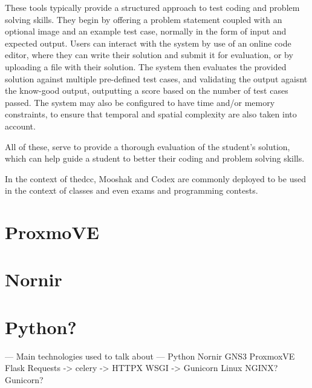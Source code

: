 These tools typically provide a structured approach to test coding and problem solving skills. They begin by offering a
problem statement coupled with an optional image and an example test case, normally in the form of input and expected output.
Users can interact with the system by use of an online code editor, where they can write their solution and submit it for
evaluation, or by uploading a file with their solution. The system then evaluates the provided solution against multiple
pre-defined test cases, and validating the output agaisnt the know-good output, outputting a score based on the number of 
test cases passed. The system may also be configured to have time and/or memory constraints, to ensure that temporal and
spatial complexity are also taken into account.

All of these, serve to provide a thorough evaluation of the student's solution, which can help guide a student to better
their coding and problem solving skills.

In the context of the\ac{dcc}, Mooshak and Codex are commonly deployed to be used in the context of classes and 
even exams and programming contests.


\section{ProxmoVE}

\section{Nornir}

\section{Python?}


--- Main technologies used to talk about ---
Python
Nornir
GNS3
ProxmoxVE
Flask
Requests -> celery -> HTTPX
WSGI -> Gunicorn
Linux
NGINX?
Gunicorn?